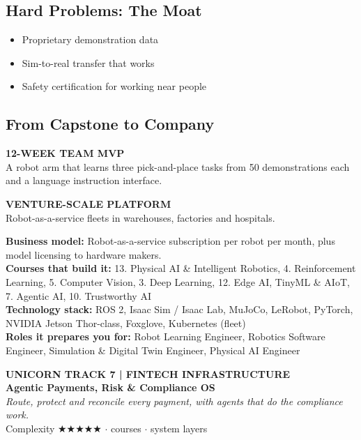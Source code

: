 \documentclass[10pt,a4paper]{article}
\begin{document}
\subsection*{Hard Problems: The Moat}\begin{itemize}\small
\item Proprietary demonstration data
\item Sim-to-real transfer that works
\item Safety certification for working near people
\end{itemize}
\subsection*{From Capstone to Company}
\begin{tcbraster}[raster columns=2,raster equal height,raster column skip=8pt]\begin{tcolorbox}[colback=l1bg,colframe=l1bg,arc=2pt,borderline north={2.5pt}{0pt}{saffron}]{\scriptsize\bfseries\color{muted}12-WEEK TEAM MVP}\\\small A robot arm that learns three pick-and-place tasks from 50 demonstrations each and a language instruction interface.\end{tcolorbox}\begin{tcolorbox}[colback=l3bg,colframe=l3bg,arc=2pt,borderline north={2.5pt}{0pt}{igreen}]{\scriptsize\bfseries\color{muted}VENTURE-SCALE PLATFORM}\\\small Robot-as-a-service fleets in warehouses, factories and hospitals.\end{tcolorbox}\end{tcbraster}
{\small\textbf{Business model:} Robot-as-a-service subscription per robot per month, plus model licensing to hardware makers.\\\textbf{Courses that build it:} 13. Physical AI \& Intelligent Robotics, 4. Reinforcement Learning, 5. Computer Vision, 3. Deep Learning, 12. Edge AI, TinyML \& AIoT, 7. Agentic AI, 10. Trustworthy AI\\\textbf{Technology stack:} ROS 2, Isaac Sim / Isaac Lab, MuJoCo, LeRobot, PyTorch, NVIDIA Jetson Thor-class, Foxglove, Kubernetes (fleet)\\\textbf{Roles it prepares you for:} Robot Learning Engineer, Robotics Software Engineer, Simulation \& Digital Twin Engineer, Physical AI Engineer}
\newpage
\begin{tcolorbox}[colback=navy,colframe=navy,arc=2pt,left=8pt,top=5pt,bottom=5pt]{\small\bfseries\color{goldl}UNICORN TRACK 7 \;|\; FINTECH INFRASTRUCTURE}\\[1pt]{\LARGE\bfseries\color{white}Agentic Payments, Risk \& Compliance OS}\\[2pt]{\small\itshape\color{goldl}Route, protect and reconcile every payment, with agents that do the compliance work.}\\[2pt]{\small\color{white}Complexity {\color{goldl}★★★★★} \;$\cdot$ courses \;$\cdot$ system layers}\end{tcolorbox}
\end{document}
